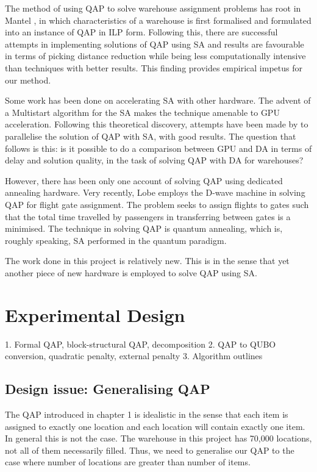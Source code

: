 \documentclass[hyp]{socreport}
\begin{document}
The method of using QAP to solve warehouse assignment problems has root in Mantel \cite{Mantel:2007}, in which characteristics of a warehouse is first formalised and formulated into an instance of QAP in ILP form. Following this, there are successful attempts in implementing solutions of QAP \cite{Ruijter:2007} using SA and results are favourable in terms of picking distance reduction while being less computationally intensive than techniques with better results. This finding provides empirical impetus for our method.

Some work has been done on accelerating SA with other hardware. The advent of a Multistart algorithm \cite{Marti:2013} for the SA makes the technique amenable to GPU acceleration. Following this theoretical discovery, attempts have been made by \cite{Sonuc:2018} to parallelise the solution of QAP with SA, with good results. The question that follows is this: is it possible to do a comparison between GPU and DA in terms of delay and solution quality, in the task of solving QAP with DA for warehouses?

However, there has been only one account of solving QAP using dedicated annealing hardware. Very recently, Lobe employs the D-wave machine in solving QAP for flight gate assignment. The problem seeks to assign flights to gates such that the total time travelled by passengers in transferring between gates is a minimised. The technique in solving QAP is quantum annealing, which is, roughly speaking, SA performed in the quantum paradigm. 

The work done in this project is relatively new. This is in the sense that yet another piece of new hardware is employed to solve QAP using SA.

\chapter{Experimental Design}
1. Formal QAP, block-structural QAP, decomposition
2. QAP to QUBO conversion, quadratic penalty, external penalty
3. Algorithm outlines

\section{Design issue: Generalising QAP}
\label{sec:generalQAP}
The QAP introduced in chapter 1 is idealistic in the sense that each item is assigned to exactly one location and each location will contain exactly one item. In general this is not the case. The warehouse in this project has 70,000 locations, not all of them necessarily filled. Thus, we need to generalise our QAP to the case where number of locations are greater than number of items.
\end{document}
